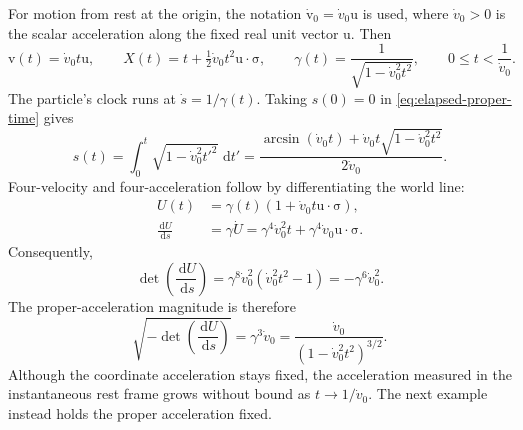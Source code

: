 \documentclass[11pt]{article}
\newcommand{\pv}[1]{{#1}}
\newcommand{\vstyle}[1]{{\bm{\mathrm{#1}}}}
\newcommand{\pU}{\pv{U}}
\newcommand{\pX}{\pv{X}}
\numberwithin{equation}{section}
\newcommand{\dotprod}{\cdot}
\newcommand{\bsig}{\vstyle{\sigma}}
\newcommand{\bv}{\vstyle{v}}
\newcommand{\bu}{\vstyle{u}}
\newcommand{\dd}{\,\mathrm d}
\begin{document}
For motion from rest at the origin, the notation $\dot{\bv}_0=\dot{v}_0\bu$ is used,
where $\dot{v}_0>0$ is the scalar acceleration along the fixed real unit
vector $\bu$. Then
\[
 \bv(t)=\dot{v}_0t\bu,\qquad
 \pX(t)=t+\tfrac12\dot{v}_0t^2\bu\dotprod\bsig,\qquad
 \gamma(t)=\frac{1}{\sqrt{1-\dot{v}_0^2t^2}},
 \qquad 0\le t<\frac{1}{\dot{v}_0}.
\]
The particle's clock runs at $\dot{s}=1/\gamma(t)$. Taking $s(0)=0$
in \eqref{eq:elapsed-proper-time} gives
\begin{equation}
 s(t)=\int_0^t\sqrt{1-\dot{v}_0^2t'^2}\,\dd t'
 =\frac{\arcsin(\dot{v}_0t)+\dot{v}_0t\sqrt{1-\dot{v}_0^2t^2}}{2\dot{v}_0}.
 \label{eq:constant-coordinate-acceleration-clock}
\end{equation}
Four-velocity and four-acceleration follow by differentiating the world line:
\begin{align*}
 \pU(t)&=\gamma(t)(1+\dot{v}_0t\bu\dotprod\bsig),\\
 \frac{\dd\pU}{\dd s}
 &=\gamma\dot{\pU}
 =\gamma^4\dot{v}_0^2t+\gamma^4\dot{v}_0\bu\dotprod\bsig.
\end{align*}
Consequently,
\[
 \det\left(\frac{\dd\pU}{\dd s}\right)
 =\gamma^8\dot{v}_0^2(\dot{v}_0^2t^2-1)
 =-\gamma^6\dot{v}_0^2.
\]
The proper-acceleration magnitude is therefore
\[
 \sqrt{-\det\left(\frac{\dd\pU}{\dd s}\right)}=\gamma^3\dot{v}_0
 =\frac{\dot{v}_0}{(1-\dot{v}_0^2t^2)^{3/2}}.
\]
Although the coordinate acceleration stays fixed, the acceleration
measured in the instantaneous rest frame grows without bound as
$t\to1/\dot{v}_0$. The next example instead holds the proper acceleration fixed.
\end{document}
